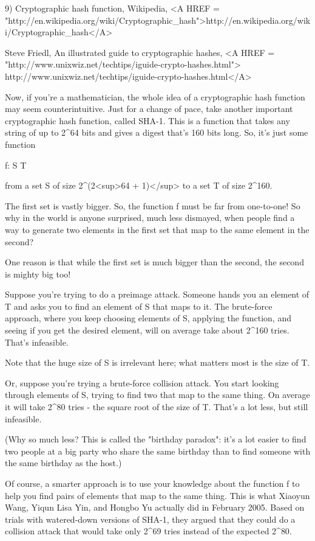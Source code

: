 9) Cryptographic hash function, Wikipedia, 
<A HREF = "http://en.wikipedia.org/wiki/Cryptographic_hash">http://en.wikipedia.org/wiki/Cryptographic_hash</A>

Steve Friedl, An illustrated guide to cryptographic hashes,
<A HREF = "http://www.unixwiz.net/techtips/iguide-crypto-hashes.html">
http://www.unixwiz.net/techtips/iguide-crypto-hashes.html</A>

Now, if you're a mathematician, the whole idea of a cryptographic 
hash function may seem counterintuitive.  Just for a change of pace, 
take another important cryptographic hash function, called SHA-1.  
This is a function that takes any string of up to 2^{64} bits and 
gives a digest that's 160 bits long.  So, it's just some function

f: S \to  T

from a set S of size 2^{(2<sup>64} + 1)</sup> to a set T 
of size 2^{160}. 

The first set is vastly bigger.   So, the function f must be far from 
one-to-one!  So why in the world is anyone surprised, much less dismayed, 
when people find a way to generate two elements in the first set that map 
to the same element in the second?

One reason is that while the first set is much bigger than the second, 
the second is mighty big too!  

Suppose you're trying to do a preimage attack.  Someone hands you an 
element of T and asks you to find an element of S that maps to it.  
The brute-force approach, where you keep choosing elements of S, 
applying the function, and seeing if you get the desired element, 
will on average take about 2^{160} tries.  That's infeasible.  

Note that the huge size of S is irrelevant here; what matters most
is the size of T.

Or, suppose you're trying a brute-force collision attack.  You start 
looking through elements of S, trying to find two that map to the same
thing.  On average it will take 2^{80} tries - the square root of the
size of T.  That's a lot less, but still infeasible.  

(Why so much less?  This is called the "birthday paradox": it's a lot
easier to find two people at a big party who share the same birthday
than to find someone with the same birthday as the host.)

Of course, a smarter approach is to use your knowledge about the function 
f to help you find pairs of elements that map to the same thing.  This 
is what Xiaoyun Wang, Yiqun Lisa Yin, and Hongbo Yu actually did in 
February 2005.  Based on trials with watered-down versions of SHA-1, 
they argued that they could do a collision attack that would take only 
2^{69} tries instead of the expected 2^{80}.

